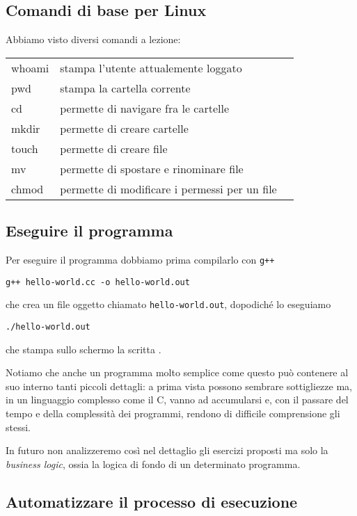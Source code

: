 \documentclass[class=article, crop=false, 12pt]{standalone}
\begin{document}
\subsection{Comandi di base per Linux}

Abbiamo visto diversi comandi a lezione:

\begin{table}
	\begin{tabular}{@{} >{\ttfamily}l l l @{}}
		whoami & stampa l'utente attualemente loggato \\
		pwd & stampa la cartella corrente \\
		cd & permette di navigare fra le cartelle \\
		mkdir & permette di creare cartelle \\
		touch & permette di creare file \\
		mv & permette di spostare e rinominare file \\
		chmod & permette di modificare i permessi per un file \\
	\end{tabular}
\end{table}

\subsection{Eseguire il programma}

\noindent
Per eseguire il programma dobbiamo prima compilarlo con \texttt{g++}
\begin{verbatim}
g++ hello-world.cc -o hello-world.out
\end{verbatim}
che crea un file oggetto chiamato \texttt{hello-world.out}, dopodiché lo eseguiamo
\begin{verbatim}
./hello-world.out
\end{verbatim}
che stampa sullo schermo la scritta .

Notiamo che anche un programma molto semplice come questo può contenere al suo interno tanti piccoli dettagli: a prima vista possono sembrare sottigliezze ma, in un linguaggio complesso come il C, vanno ad accumularsi e, con il passare del tempo e della complessità dei programmi, rendono di difficile comprensione gli stessi.

In futuro non analizzeremo così nel dettaglio gli esercizi proposti ma solo la \emph{business logic}, ossia la logica di fondo di un determinato programma.

\subsection{Automatizzare il processo di esecuzione}
\end{document}
